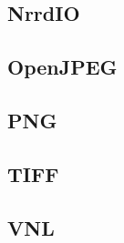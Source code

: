 \subsection{NrrdIO}


\subsection{OpenJPEG}


\subsection{PNG}


\subsection{TIFF}


\subsection{VNL}


